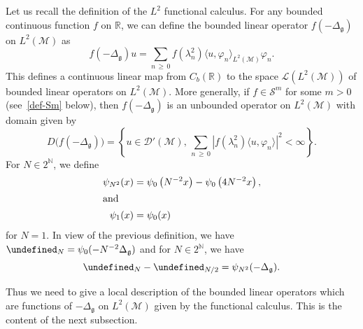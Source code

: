 \documentclass[AHL,Unicode,longabstracts,published]{cedram}
\newcommand{\R}{\mathbb{R}}
\newcommand{\N}{\mathbb{N}}
\let\P= \undefined
\newcommand{\P}{\mathbf{P}}
\renewcommand{\L}{\mathcal{L}}
\renewcommand{\S}{\mathcal{S}}
\newcommand{\Dp}{\mathcal{D}'}
\newcommand{\M}{\mathcal{M}}
\newcommand{\g}{\mathfrak{g}}
\newcommand{\Dlg}{\Delta_{\g}}
\begin{document}
Let us recall the definition of the $L^2$ functional calculus. For any bounded continuous function $f$ on $\R$, we can define the bounded linear operator $f(-\Dlg)$ on $L^2(\M)$ as
\begin{equation}\label{def-func-calculus}
f(-\Dlg)u = \sum_{n\,\geq\,0}f\left(\lambda_n^2\right)\langle u,\varphi_n\rangle_{L^2(\M)}\varphi_n.
\end{equation}
This defines a continuous linear map from $C_b(\R)$ to the space $\L(L^2(\M))$ of bounded linear operators on $L^2(\M)$. More generally, if $f\in\S^m$ for some $m>0$ (see~\eqref{def-Sm} below), then $f(-\Dlg)$ is an unbounded operator on $L^2(\M)$ with domain given by
\begin{equation*}
D\big(f(-\Dlg)\big) = \left\{u\in \Dp(\M),\,\sum_{n\,\geq\,0}\left|f\left(\lambda_n^2\right)\langle u,\varphi_n\rangle\right|^2<\infty\right\}.
\end{equation*}
For $N\in 2^{\N}$, we define
\begin{align*}
\psi_{N^2}(x) &= \psi_0\left(N^{-2}x\right)-\psi_0\left(4N^{-2}x\right),
\\
\intertext{and}
\psi_1(x) &= \psi_0(x)
\end{align*}
for $N=1$. In view of the previous definition, we have $\P_N = \psi_0(-N^{-2}\Dlg)$ and for $N\in 2^{\N}$, we have
\begin{equation*}
\P_N-\P_{N/2} = \psi_{N^2}(-\Dlg).
\end{equation*}

Thus we need to give a local description of the bounded linear operators which are functions of $-\Dlg$ on $L^2(\M)$ given by the functional calculus. This is the content of the next subsection.
\end{document}
